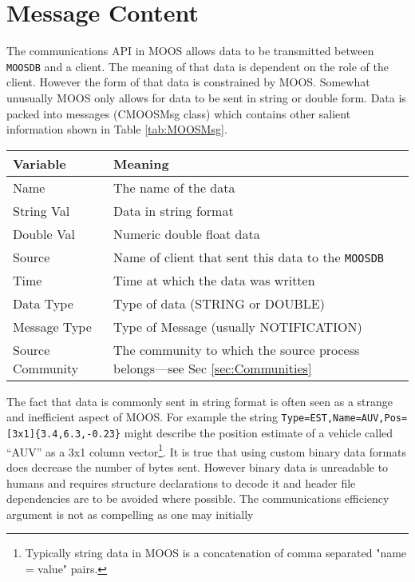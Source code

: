 \documentclass[a4paper,10pt]{article}
\newcommand{\Code}[1]{\texttt{#1} }
\newcommand{\code}[1]{\Code{#1} }
\newcommand{\DB}   {\code{{MOOSDB}}}
\begin{document}
\section{Message Content}\label{sec:Content}
The communications API in MOOS allows data to be transmitted
between \DB and a client. The meaning of that data is dependent on
the role of the client. However the form of that data is
constrained by MOOS. Somewhat unusually MOOS only allows for data
to be sent in string or double form. Data is packed into messages
(CMOOSMsg class) which contains other salient information shown in
Table \ref{tab:MOOSMsg}.
\begin{table*}
\centering
\begin{tabular}{l|l}\hline
  {\textbf{Variable}} & {\textbf{Meaning}} \\ \hline
  Name  & The name of the data \\
  String Val & Data in string format \\
  Double Val & Numeric double float data \\
  Source & Name of client that sent this data to the \DB \\
  Time & Time at which the data was written \\
  Data Type & Type of data (STRING or DOUBLE)  \\
  Message Type & Type of Message (usually NOTIFICATION) \\
  Source Community & The community to which the source process
belongs---see Sec \ref{sec:Communities}\\\hline
\end{tabular}\vspace{7mm}
  \caption{Contents of MOOS Message}\label{tab:MOOSMsg}
\end{table*}
The fact that data is commonly sent in string format is often seen
as a strange and inefficient aspect of MOOS. For example the
string \verb"Type=EST,Name=AUV,Pos=[3x1]{3.4,6.3,-0.23}" might
describe the position estimate of a vehicle called ``AUV'' as a
3x1 column vector\footnote{Typically string data in MOOS is a
concatenation of comma separated "name = value" pairs.}. It is
true that using custom binary data formats does decrease the
number of bytes sent. However binary data is unreadable to humans
and requires structure declarations to decode it and header file
dependencies are to be avoided where possible. The communications
efficiency argument is not as compelling as one may initially
\end{document}
